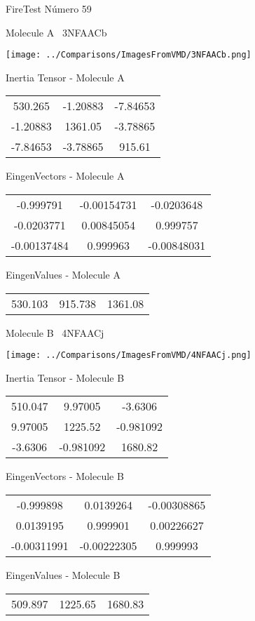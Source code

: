 \vtab[-3cm]
\begin{center}
{\large FireTest \tab Número 59}
\end{center}
\begin{multicols}{2}
\begin{center}

Molecule A \
3NFAACb

\texttt{[image: ../Comparisons/ImagesFromVMD/3NFAACb.png]}

Inertia Tensor - Molecule A \\
\begin{tabular}{|c c c|}
530.265	 & 	-1.20883	 & 	-7.84653	 \\
-1.20883	 & 	1361.05	 & 	-3.78865	 \\
-7.84653	 & 	-3.78865	 & 	915.61
\end{tabular}

\vtab
 EingenVectors - Molecule A     \\
\begin{tabular}{|c c c|}
-0.999791	 & 	-0.00154731	 & 	-0.0203648	 \\
-0.0203771	 & 	0.00845054	 & 	0.999757	 \\
-0.00137484	 & 	0.999963	 & 	-0.00848031
\end{tabular}

\vtab
 EingenValues - Molecule A     \\
\begin{tabular}{|c c c|}
530.103	 & 	915.738	 & 	1361.08	 \\
\end{tabular}
\columnbreak

Molecule B \
4NFAACj

\texttt{[image: ../Comparisons/ImagesFromVMD/4NFAACj.png]}

Inertia Tensor - Molecule B \\
\begin{tabular}{|c c c|}
510.047	 & 	9.97005	 & 	-3.6306	 \\
9.97005	 & 	1225.52	 & 	-0.981092	 \\
-3.6306	 & 	-0.981092	 & 	1680.82
\end{tabular}

\vtab
 EingenVectors - Molecule B     \\
\begin{tabular}{|c c c|}
-0.999898	 & 	0.0139264	 & 	-0.00308865	 \\
0.0139195	 & 	0.999901	 & 	0.00226627	 \\
-0.00311991	 & 	-0.00222305	 & 	0.999993
\end{tabular}

\vtab
 EingenValues - Molecule B     \\
\begin{tabular}{|c c c|}
509.897	 & 	1225.65	 & 	1680.83	 \\
\end{tabular}

\end{center}
\end{multicols}

